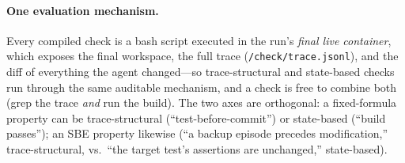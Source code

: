 \documentclass[11pt]{article}
\begin{document}
\paragraph{One evaluation mechanism.} Every compiled check is a bash script
executed in the run's \emph{final live container}, which exposes the final
workspace, the full trace (\texttt{/check/trace.jsonl}), and the diff of
everything the agent changed---so trace-structural and state-based checks run
through the same auditable mechanism, and a check is free to combine both (grep
the trace \emph{and} run the build).
The two axes are orthogonal: a fixed-formula property can be trace-structural
(``test-before-commit'') or state-based (``build passes''); an SBE property
likewise (``a backup episode precedes modification,'' trace-structural, vs.\
``the target test's assertions are unchanged,'' state-based).
\end{document}
